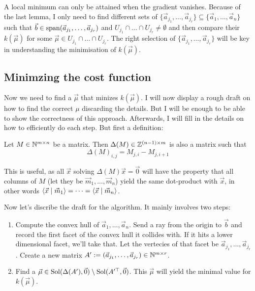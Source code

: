 A local minimum can only be attained when the gradient vanishes. Because of the last lemma, I only need to find different sets of $\{\vec a_{j_1}, \dots, \vec a_{j_r}\} \subseteq \{\vec a_1, \dots, \vec a_n\}$ such that $\vec b \in \operatorname{span}(\vec a_{j_1}, \dots, \vec a_{j_r})$ and $U_{j_1} \cap \dots \cap U_{j_r} \neq \emptyset$ and then compare their $k(\vec\mu)$ for some $\vec\mu \in U_{j_1} \cap \dots \cap U_{j_r}$. The right selection of $\{\vec a_{j_1}, \dots, \vec a_{j_r}\}$ will be key in understanding the minimisation of $k(\vec\mu)$. 

\subsection{Minimzing the cost function}
Now we need to find a $\vec\mu$ that minizes $k(\vec\mu)$. I will now display a rough draft on how to find the correct $\mu$ discarding the details. But I will be enough to be able to show the correctness of this approach. Afterwards, I will fill in the details on how to efficiently do each step. But first a definition:
\begin{definition}
    Let $M \in \mathbb{N}^{m\times n}$ be a matrix. Then $\Delta(M) \in \mathbb{Z}^{(n-1)\times m}$ is also a matrix such that 
    $$\Delta(M)_{i,j} = M_{j,i} - M_{j,i+1}$$
\end{definition}
This is useful, as all $\vec x$ solving $\Delta(M)\vec x = \vec 0$ will have the property that all columns of $M$ (let they be $\vec m_1, \dots, \vec m_n$) yield the same dot-product with $\vec x$, in other words $\langle \vec x \mid \vec m_1 \rangle = \dots = \langle \vec x \mid \vec m_n \rangle$.

Now let's discribe the draft for the algorithm. It mainly involves two steps:
\begin{algorithm}
    \label{algo}
    \begin{enumerate}
        \item Compute the convex hull of $\vec a_1, \dots, \vec a_n$. Send a ray from the origin to $\vec b$ and record the first facet of the convex hull it collides with. If it hits a lower dimensional facet, we'll take that. Let the vertecies of that facet be $\vec a_{j_1}, \dots, \vec a_{j_r}$. Create a new matrix $A' := (\vec a_{j_1}, \dots, \vec a_{j_r}) \in \mathbb{N}^{m \times r}$.
        \item Find a $\vec\mu \in \operatorname{Sol}(\Delta(A'), \vec0) \setminus \operatorname{Sol}(A'^\top, \vec0)$. This $\vec\mu$ will yield the minimal value for $k(\vec\mu)$.
    \end{enumerate}
\end{algorithm}

